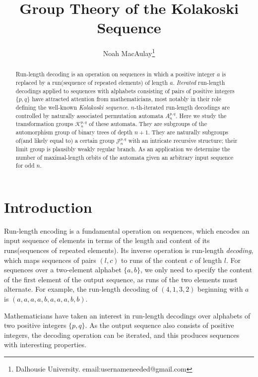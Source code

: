 \documentclass[11pt]{article}
\title{Group Theory of the Kolakoski Sequence}
\author{Noah MacAulay\footnote{Dalhousie University. email:usernameneeded@gmail.com}}
\theoremstyle{plain}
\theoremstyle{definition}
\begin{document}
\maketitle


\begin{abstract}
Run-length decoding is an operation on sequences in which a positive integer $a$ is replaced by a run(sequence of repeated elements) of length $a$. \emph{Iterated} run-length decodings applied to sequences with alphabets consisting of pairs of positive integers $\{p, q\}$ have attracted attention from mathematicians, most notably in their role defining the well-known \emph{Kolakoski sequence}. $n$-th-iterated run-length decodings are controlled by naturally associated permutation automata $A^{p,q}_n$. Here we study the transformation groups $\mathcal{K}^{p,q}_n$ of these automata. They are subgroups of the automorphism group of binary trees of depth $n+1$. They are naturally subgroups of(and likely equal to) a certain group $\mathcal{J}_n^{p,q}$ with an intricate recursive structure; their limit group is plausibly weakly regular branch. As an application we determine the number of maximal-length orbits of the automata given an arbitrary input sequence for odd $n$.

\end{abstract}




\section{Introduction}

Run-length encoding is a fundamental operation on sequences, which encodes an input sequence of elements in terms of the length and content of its runs(sequences of repeated elements). Its inverse operation is run-length \emph{decoding}, which maps sequences of pairs $(l, c)$ to runs of the content $c$ of length $l$. For sequences over a two-element alphabet $\{a, b\}$, we only need to specify the content of the first element of the output sequence, as runs of the two elements must alternate. For example, the run-length decoding of $(4, 1, 3, 2)$  beginning with $a$ is $(a, a, a, a, b, a, a, a, b, b)$.

Mathematicians have taken an interest in run-length decodings over alphabets of two positive integers $\{p, q\}$. As the output sequence also consists of positive integers, the decoding operation can be iterated, and this produces sequences with interesting properties. 
\end{document}
